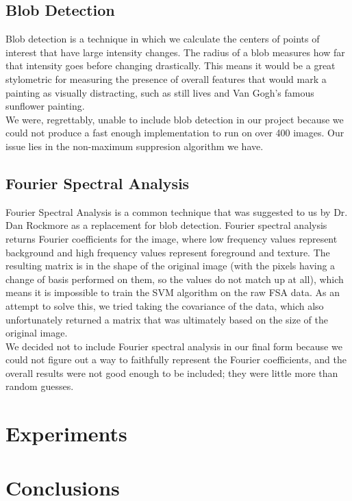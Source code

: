 \documentclass[twocolumn]{article}
\begin{document}
  \subsection{Blob Detection}
  Blob detection is a technique in which we calculate the centers of points of
  interest that have large intensity changes. The radius of a blob measures
  how far that intensity goes before changing drastically. This means it would
  be a great stylometric for measuring the presence of overall features that
  would mark a painting as visually distracting, such as still lives and Van
  Gogh's famous sunflower painting. \\

  We were, regrettably, unable to include blob detection in our project
  because we could not produce a fast enough implementation to run on over 400
  images. Our issue lies in the non-maximum suppresion algorithm we have.

  \subsection{Fourier Spectral Analysis}
  Fourier Spectral Analysis is a common technique that was suggested to us by
  Dr. Dan Rockmore as a replacement for blob detection. Fourier spectral
  analysis returns Fourier coefficients for the image, where low frequency
  values represent background and high frequency values represent foreground
  and texture. The resulting matrix is in the shape of the original image
  (with the pixels having a change of basis performed on them, so the values
  do not match up at all), which means it is impossible to train the SVM
  algorithm on the raw FSA data. As an attempt to solve this, we tried taking
  the covariance of the data, which also unfortunately returned a matrix that
  was ultimately based on the size of the original image. \\

  We decided not to include Fourier spectral analysis in our final form
  because we could not figure out a way to faithfully represent the Fourier
  coefficients, and the overall results were not good enough to be included;
  they were little more than random guesses.

  \section{Experiments}

  \section{Conclusions}
\end{document}

